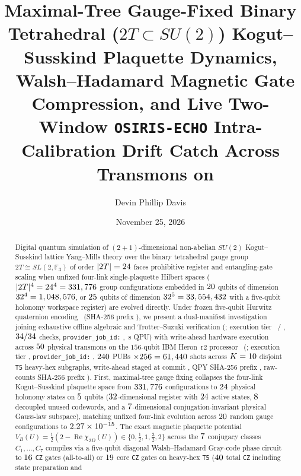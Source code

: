 \documentclass[aps,prx,twocolumn,superscriptaddress,nofootinbib]{revtex4-2}
\begin{document}
\title{Maximal-Tree Gauge-Fixed Binary Tetrahedral ($2T \subset SU(2)$) Kogut--Susskind Plaquette Dynamics, \BTPlaqFezCzReductionRatio\ Walsh--Hadamard Magnetic Gate Compression, and Live Two-Window \texttt{OSIRIS-ECHO} Intra-Calibration Drift Catch Across \BTPlaqFezTotalTransmons\ Transmons on \BTPlaqFezBackend}

\author{Devin Phillip Davis}
\date{November 25, 2026}

\begin{abstract}
Digital quantum simulation of $(2+1)$-dimensional non-abelian $SU(2)$ Kogut--Susskind lattice Yang--Mills theory over the binary tetrahedral gauge group $2T \cong SL(2,\mathbb{F}_3)$ of order $|2T| = 24$ faces prohibitive register and entangling-gate scaling when unfixed four-link single-plaquette Hilbert spaces ($|2T|^4 = 24^4 = 331,776$ group configurations embedded in $20$ qubits of dimension $32^4 = 1,048,576$, or $25$ qubits of dimension $32^5 = 33,554,432$ with a five-qubit holonomy workspace register) are evolved directly. Under frozen five-qubit Hurwitz quaternion encoding \BTPlaqEncVer\ (SHA-256 prefix \BTPlaqEncShaPrefix), we present a dual-manifest investigation joining exhaustive offline algebraic and Trotter--Suzuki verification (\BTPlaqSimExperimentId; execution tier \BTPlaqSimExecTier\ / \BTPlaqSimExactTier, $34/34$ checks, \texttt{provider\_job\_id:} \BTPlaqSimJobId, \BTPlaqSimQpuSec\,s QPU) with write-ahead hardware execution across $50$ physical transmons on the $156$-qubit IBM Heron~r2 processor \BTPlaqFezBackend\ (\BTPlaqFezProtocolId; execution tier \BTPlaqFezExecTier, \texttt{provider\_job\_id:} \BTPlaqFezJobId, $240$ PUBs $\times 256 = 61,440$ shots across $K = 10$ disjoint \texttt{T5} heavy-hex subgraphs, write-ahead staged at commit \BTPlaqFezWriteAheadCommit, QPY SHA-256 prefix \BTPlaqFezQpyShaPrefix, raw-counts SHA-256 prefix \BTPlaqFezRawCountsShaPrefix). First, maximal-tree gauge fixing collapses the four-link Kogut--Susskind plaquette space from $331,776$ configurations to $24$ physical holonomy states on $5$ qubits ($32$-dimensional register with $24$ active states, $8$ decoupled unused codewords, and a $7$-dimensional conjugation-invariant physical Gauss-law subspace), matching unfixed four-link evolution across $20$ random gauge configurations to $2.27 \times 10^{-15}$. The exact magnetic plaquette potential $V_B(U) = \tfrac{1}{2}(2 - \operatorname{Re}\chi_{2D}(U)) \in \{0, \tfrac{1}{2}, 1, \tfrac{3}{2}, 2\}$ across the $7$ conjugacy classes $C_1,\dots,C_7$ compiles via a five-qubit diagonal Walsh--Hadamard Gray-code phase circuit to $16$ \texttt{CZ} gates (all-to-all) or $19$ core \texttt{CZ} gates on heavy-hex \texttt{T5} ($40$ total \texttt{CZ} including state preparation and 
\end{abstract}
\end{document}
